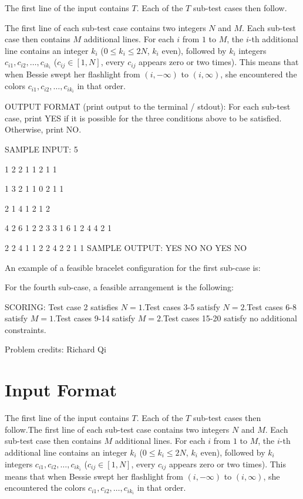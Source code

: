 \documentclass[12pt]{article}
\begin{document}
The first line of the input contains $T$.  Each of the $T$ sub-test cases then
follow.  

The first line of each sub-test case contains two integers $N$ and $M$. Each
sub-test case then contains $M$ additional lines. For each $i$ from $1$ to $M$,
the $i$-th additional line contains an integer $k_i$ ($0\le k_i\le 2N$, $k_i$
even), followed by $k_i$ integers $c_{i1}, c_{i2},\ldots, c_{ik_i}$
($c_{ij}\in [1,N]$, every $c_{ij}$ appears zero or two times). This means that
when Bessie swept her flashlight from $(i,-\infty)$ to $(i,\infty)$, she
encountered the colors $c_{i1}, c_{i2},\ldots, c_{ik_i}$ in that order.

OUTPUT FORMAT (print output to the terminal / stdout):
For each sub-test case, print YES if it is possible for the three conditions
above to be satisfied. Otherwise, print NO. 

SAMPLE INPUT:
5

1 2
2 1 1
2 1 1

1 3
2 1 1
0
2 1 1

2 1
4 1 2 1 2

4 2
6 1 2 2 3 3 1
6 1 2 4 4 2 1

2 2
4 1 1 2 2
4 2 2 1 1
SAMPLE OUTPUT: 
YES
NO
NO
YES
NO

An example of a feasible bracelet configuration for the first sub-case is:


For the fourth sub-case, a feasible arrangement is the following:


SCORING:
Test case 2 satisfies $N = 1$.Test cases 3-5 satisfy $N=2$.Test cases 6-8 satisfy $M=1$.Test cases 9-14 satisfy $M=2$.Test cases 15-20 satisfy no additional constraints.


Problem credits: Richard Qi



\section*{Input Format}
The first line of the input contains $T$.  Each of the $T$ sub-test cases then
follow.The first line of each sub-test case contains two integers $N$ and $M$. Each
sub-test case then contains $M$ additional lines. For each $i$ from $1$ to $M$,
the $i$-th additional line contains an integer $k_i$ ($0\le k_i\le 2N$, $k_i$
even), followed by $k_i$ integers $c_{i1}, c_{i2},\ldots, c_{ik_i}$
($c_{ij}\in [1,N]$, every $c_{ij}$ appears zero or two times). This means that
when Bessie swept her flashlight from $(i,-\infty)$ to $(i,\infty)$, she
encountered the colors $c_{i1}, c_{i2},\ldots, c_{ik_i}$ in that order.
\end{document}

